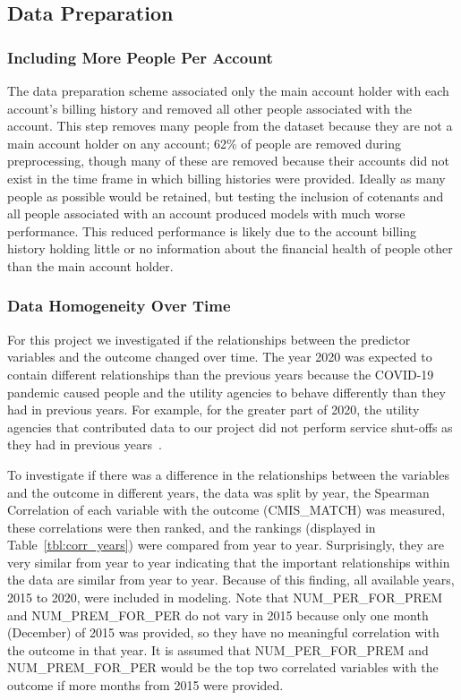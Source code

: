 \documentclass[10pt,letterpaper]{article}
\begin{document}
\subsection*{Data Preparation}
\subsubsection*{Including More People Per Account}
The data preparation scheme associated only the main account holder with each account's billing history and removed all other people associated with the account. This step removes many people from the dataset because they are not a main account holder on any account; 62\% of people are removed during preprocessing, though many of these are removed because their accounts did not exist in the time frame in which billing histories were provided. Ideally as many people as possible would be retained, but testing the inclusion of cotenants and all people associated with an account produced models with much worse performance. This reduced performance is likely due to the account billing history holding little or no information about the financial health of people other than the main account holder.

\subsubsection*{Data Homogeneity Over Time}
For this project we investigated if the relationships between the predictor variables and the outcome changed over time. The year 2020 was expected to contain different relationships than the previous years because the COVID-19 pandemic caused people and the utility agencies to behave differently than they had in previous years. For example, for the greater part of 2020, the utility agencies that contributed data to our project did not perform service shut-offs as they had in previous years~\cite{white2020utilities}. 

To investigate if there was a difference in the relationships between the variables and the outcome in different years, the data was split by year, the Spearman Correlation of each variable with the outcome (CMIS\_MATCH) was measured, these correlations were then ranked, and the rankings (displayed in Table~\ref{tbl:corr_years}) were compared from year to year. Surprisingly, they are very similar from year to year indicating that the important relationships within the data are similar from year to year. Because of this finding, all available years, 2015 to 2020, were included in modeling. Note that NUM\_PER\_FOR\_PREM and NUM\_PREM\_FOR\_PER do not vary in 2015 because only one month (December) of 2015 was provided, so they have no meaningful correlation with the outcome in that year. It is assumed that NUM\_PER\_FOR\_PREM and NUM\_PREM\_FOR\_PER would be the top two correlated variables with the outcome if more months from 2015 were provided.
\end{document}
